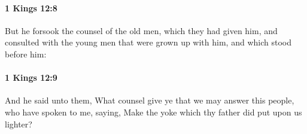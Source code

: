 		\paragraph{1 Kings 12:8} %
			\label{1KINGS-12-8}

			But he forsook the counsel of the old men, which they had given him, and consulted with the young men that were grown up with him, and which stood before him:


		\paragraph{1 Kings 12:9} %
			\label{1KINGS-12-9}

			And he said unto them, What counsel give ye that we may answer this people, who have spoken to me, saying, Make the yoke which thy father did put upon us lighter?


